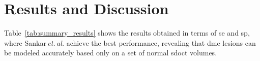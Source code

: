 \section{Results and Discussion}\label{sec:results}\label{sec:discussion}

Table~\ref{tab:summary_results} shows the results obtained in terms of \gls{se} and \gls{sp}, where Sankar\,\emph{et.\,al.} achieve the best performance, revealing that \gls{dme} lesions can be modeled accurately based only on a set of normal \gls{sdoct} volumes.
% 
